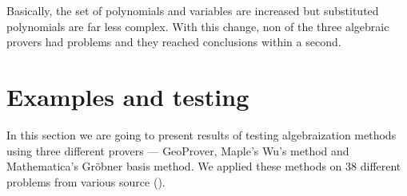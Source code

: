 \documentclass[final,1p,times,authoryear]{elsarticle}
\begin{document}
Basically, the set of polynomials and variables are increased but
substituted polynomials are far less complex. With this change, non of
the three algebraic provers had problems and they reached conclusions
within a second.

\section{Examples and testing}

In this section we are going to present results of testing
algebraization methods using three different provers --- GeoProver,
Maple's Wu's method and Mathematica's Gr\"obner basis method. We
applied these methods on 38 different problems from various source
(\cite{janicic1997zbirka, shao2016challenging, arhzbirka, kinknjiga}).
\end{document}
